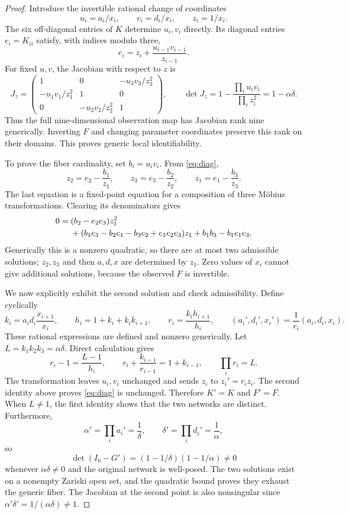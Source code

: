 \documentclass[11pt,a4paper]{article}
\begin{document}
\begin{proof}
Introduce the invertible rational change of coordinates
\[
 u_i=a_i/x_i,\qquad v_i=d_i/x_i,\qquad z_i=1/x_i.
\]
The six off-diagonal entries of $K$ determine $u_i,v_i$ directly. Its
diagonal entries $e_i=K_{ii}$ satisfy, with indices modulo three,
\begin{equation}\label{eq:diag}
 e_i=z_i+\frac{u_{i-1}v_{i-1}}{z_{i-1}}.
\end{equation}
For fixed $u,v$, the Jacobian with respect to $z$ is
\[
 J_z=\begin{pmatrix}
 1&0&-u_3v_3/z_3^2\\
 -u_1v_1/z_1^2&1&0\\
 0&-u_2v_2/z_2^2&1
 \end{pmatrix},\qquad
 \det J_z=1-\frac{\prod_i u_iv_i}{\prod_i z_i^2}=1-\alpha\delta.
\]
Thus the full nine-dimensional observation map has Jacobian rank nine
generically. Inverting $F$ and changing parameter coordinates preserve this
rank on their domains. This proves generic local identifiability.

To prove the fiber cardinality, set $b_i=u_iv_i$. From \eqref{eq:diag},
\[
 z_2=e_2-\frac{b_1}{z_1},\qquad
 z_3=e_3-\frac{b_2}{z_2},\qquad
 z_1=e_1-\frac{b_3}{z_3}.
\]
The last equation is a fixed-point equation for a composition of three
M\"obius transformations. Clearing its denominators gives
\begin{align}\label{eq:quad}
 0={}&(b_2-e_2e_3)z_1^2\\
 &+(b_1e_3-b_2e_1-b_3e_2+e_1e_2e_3)z_1
   +b_1b_3-b_1e_1e_3.\notag
\end{align}
Generically this is a nonzero quadratic, so there are at most two
admissible solutions; $z_2,z_3$ and then $a,d,x$ are determined by $z_1$.
Zero values of $x_i$ cannot give additional solutions, because the observed
$F$ is invertible.

We now explicitly exhibit the second solution and check admissibility.
Define cyclically
\begin{equation}\label{eq:involution}
 k_i=a_id_i\frac{x_{i+1}}{x_i},\qquad
 h_i=1+k_i+k_ik_{i+1},\qquad
 r_i=\frac{k_ih_{i+1}}{h_i},\qquad
 (a_i',d_i',x_i')=\frac{1}{r_i}(a_i,d_i,x_i).
\end{equation}
These rational expressions are defined and nonzero generically.
Let $L=k_1k_2k_3=\alpha\delta$. Direct calculation gives
\[
 r_i-1=\frac{L-1}{h_i},\qquad
 r_i+\frac{k_{i-1}}{r_{i-1}}=1+k_{i-1},\qquad
 \prod_i r_i=L.
\]
The transformation leaves $u_i,v_i$ unchanged and sends $z_i$ to
$z_i'=r_iz_i$. The second identity above proves \eqref{eq:diag} is
unchanged. Therefore $K'=K$ and $F'=F$. When $L\ne1$, the first identity
shows that the two networks are distinct. Furthermore,
\[
 \alpha'=\prod_i a_i'=\frac1\delta,\qquad
 \delta'=\prod_i d_i'=\frac1\alpha,
\]
so
\[
 \det(I_6-G')=(1-1/\delta)(1-1/\alpha)\ne0
\]
whenever $\alpha\delta\ne0$ and the original network is well-posed.
The two solutions exist on a nonempty Zariski open set, and the quadratic
bound proves they exhaust the generic fiber. The Jacobian at the second
point is also nonsingular since $\alpha'\delta'=1/(\alpha\delta)\ne1$.
\end{proof}
\end{document}
